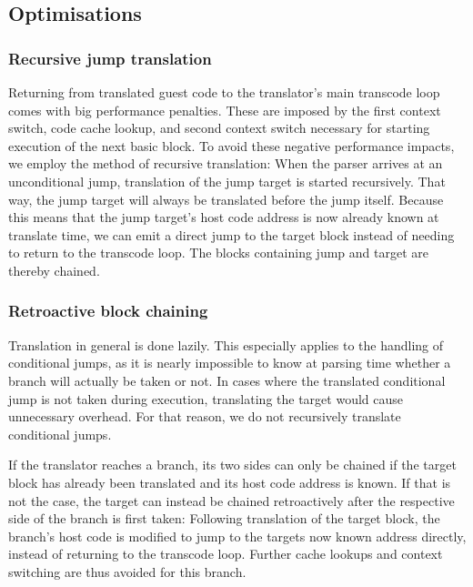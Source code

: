 \subsection{Optimisations}
\label{sec:optimise}
\subsubsection{Recursive jump translation}
\label{sec:recursive_translation}
Returning from translated guest code to the translator's main transcode loop comes with big performance penalties.
These are imposed by the first context switch, code cache lookup, and second context switch necessary for starting execution of the next basic block.
To avoid these negative performance impacts, we employ the method of recursive translation: When the parser arrives at an unconditional jump, translation of the jump target is started recursively.
That way, the jump target will always be translated before the jump itself.
Because this means that the jump target's host code address is now already known at translate time, we can emit a direct jump to the target block instead of needing to return to the transcode loop.
The blocks containing jump and target are thereby chained.

\subsubsection{Retroactive block chaining}
\label{sec:chaining}
Translation in general is done lazily.
This especially applies to the handling of conditional jumps, as it is nearly impossible to know at parsing time whether a branch will actually be taken or not.
In cases where the translated conditional jump is not taken during execution, translating the target would cause unnecessary overhead.
For that reason, we do not recursively translate conditional jumps.

If the translator reaches a branch, its two sides can only be chained if the target block has already been translated and its host code address is known.
If that is not the case, the target can instead be chained retroactively after the respective side of the branch is first taken: Following translation of the target block, the branch's host code is modified to jump to the targets now known address directly, instead of returning to the transcode loop.
Further cache lookups and context switching are thus avoided for this branch.

